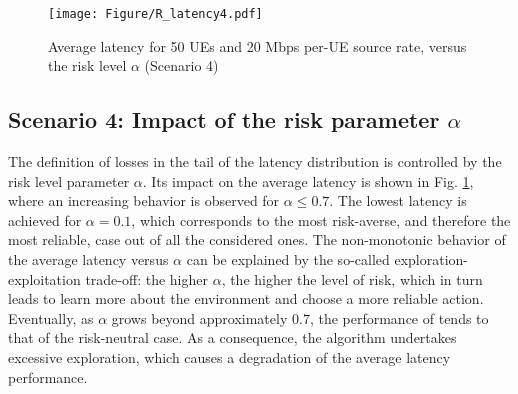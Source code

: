 \begin{figure}[ t!]
    \centering
    \texttt{[image: Figure/R\_latency4.pdf]}
    \setlength{\belowcaptionskip}{-12pt}
      \caption{Average latency for 50 UEs and 20 Mbps per-UE source rate, versus the risk level $\alpha$ (Scenario 4)}
      \label{fig:riskParam}
\end{figure}

\subsection{Scenario 4: Impact of the risk parameter $\alpha$}
The definition of losses in the tail of the latency distribution is controlled by the risk level parameter $\alpha$. Its impact on the average latency is shown in Fig. \ref{fig:riskParam}, where an increasing behavior is observed for $\alpha\leq 0.7$. The lowest latency is achieved for $\alpha=0.1$, which corresponds to the most risk-averse, and therefore the most reliable, case out of all the considered ones.
The non-monotonic behavior of the average latency versus $\alpha$ can be explained by the so-called exploration-exploitation trade-off: the higher $\alpha$, the higher the level of risk, which in turn leads \name{} to learn more about the environment and choose a more reliable action. Eventually, as $\alpha$ grows beyond approximately $0.7$, the performance of \name{} tends to that of the risk-neutral case. As a consequence, the algorithm undertakes excessive exploration, which causes a degradation of the average latency performance.


\begin{figure*}[t!]
\centering
{}
  
\caption{Average network performance for $50$ \glspl{ue} and $80$~Mbps per-UE source rate (Scenario 1) in Padova.}
  \label{fig:avgNetPerfomancePadova}
\end{figure*}




